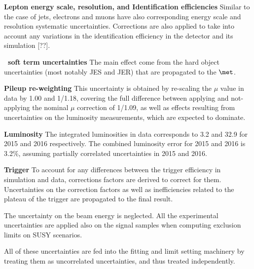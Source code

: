\textbf{Lepton energy scale, resolution, and Identification efficiencies}
Similar to the case of jets, electrons and muons have also corresponding 
energy scale and resolution systematic uncertainties. Corrections are 
also applied to take into account any variations in the identification 
efficiency in the detector and its simulation [??].

\textbf{\met\ soft term uncertainties}
The main effect come from the hard object uncertainties (most notably JES and 
JER) that are propagated to the $\met$.

\textbf{Pileup re-weighting}
This uncertainty is obtained by re-scaling the $\mu$ value in data by 1.00 and 1/1.18, 
covering the full difference between applying and not-applying the nominal $\mu$ correction of 1/1.09, 
as well as effects resulting from uncertainties on the luminosity measurements, which are expected to dominate.

\textbf{Luminosity}
The integrated luminosities in data corresponds to 3.2 \ifb and 32.9 \ifb 
for 2015 and 2016 respectively. The combined luminosity error for 2015 and 2016 is 3.2\%, assuming partially correlated uncertainties in 2015 and 2016.


\textbf{Trigger}
To account for any differences between the trigger efficiency in simulation 
and data, corrections factors are derived to correct for them. 
Uncertainties on the correction factors as well as inefficiencies 
related to the plateau of the trigger are propagated to the final result.

The uncertainty on the beam energy is neglected. 
All the experimental uncertainties are applied also on the signal samples when computing exclusion limits on SUSY scenarios. 


All of these uncertainties are fed into the fitting and limit setting 
machinery by treating them as uncorrelated uncertainties, and thus 
treated independently. 
